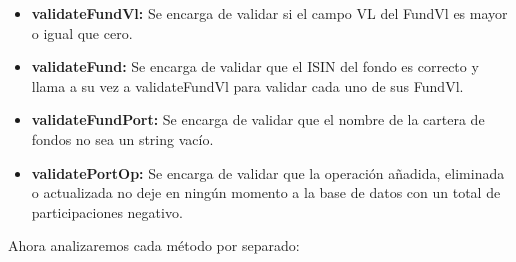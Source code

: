 \documentclass[12pt, a4paper]{article}
\begin{document}
\begin{itemize}
	\item \textbf{validateFundVl:} Se encarga de validar si el campo \gls{VL} del FundVl es mayor o igual que cero.
	\item \textbf{validateFund:} Se encarga de validar que el \gls{ISIN} del fondo es correcto y llama a su vez a validateFundVl para validar cada uno de sus FundVl.
	\item \textbf{validateFundPort:} Se encarga de validar que el nombre de la cartera de fondos no sea un string vacío.
	\item \textbf{validatePortOp:} Se encarga de validar que la operación añadida, eliminada o actualizada no deje en ningún momento a la base de datos con un total de participaciones negativo.
\end{itemize}

Ahora analizaremos cada método por separado:
\end{document}
